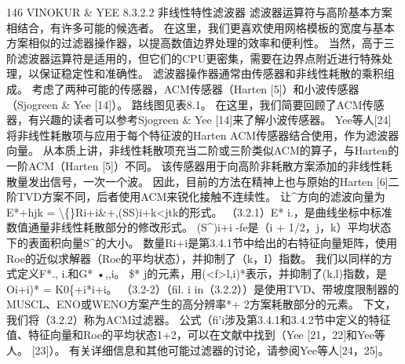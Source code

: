 \documentclass[UTF8,11pt,a4paper,openany,fontset=fandol]{ctexbook}
\begin{document}
146 VINOKUR \& YEE 8.3.2.2 非线性特性滤波器 滤波器运算符与高阶基本方案相结合，有许多可能的候选者。 在这里，我们更喜欢使用网格模板的宽度与基本方案相似的过滤器操作器，以提高数值边界处理的效率和便利性。 当然，高于三阶滤波器运算符是适用的，但它们的CPU更密集，需要在边界点附近进行特殊处理，以保证稳定性和准确性。 滤波器操作器通常由传感器和非线性耗散的乘积组成。 考虑了两种可能的传感器，ACM传感器（Harten [5]）和小波传感器（Sjogreen \& Yee [14]）。 路线图见表8.1。 在这里，我们简要回顾了ACM传感器，有兴趣的读者可以参考Sjogreen \& Yee [14]来了解小波传感器。 Yee等人[24]将非线性耗散项与应用于每个特征波的Harten ACM传感器结合使用，作为滤波器向量。 从本质上讲，非线性耗散项充当二阶或三阶类似ACM的算子，与Harten的一阶ACM（Harten [5]）不同。 该传感器用于向高阶非耗散方案添加的非线性耗散量发出信号，一次一个波。 因此，目前的方法在精神上也与原始的Harten [6]二阶TVD方案不同，后者使用ACM来锐化接触不连续性。 让\textasciicircum{}方向的滤波向量为E*+hjk = \textbackslash\{\}Ri+i\&+,(SS)i+k<jtk的形式。 （3.2.1）E* i.，是曲线坐标中标准数值通量非线性耗散部分的修改形式。 (S\textasciicircum{})i+i -fe是（i + 1/2，j，k）平均状态下的表面积向量S\textasciicircum{}的大小。 数量Ri+i是第3.4.1节中给出的右特征向量矩阵，使用Roe的近似求解器（Roe的平均状态），并抑制了（k，I）指数。 我们以同样的方式定义F*., i.和G* •,,i。 \$* j的元素，用(<f>l,i)*表示，并抑制了(k,l)指数，是Oi+i)* = K0\{+i*i+i。 （3.2-2）（fil. i in（3.2.2））是使用TVD、带坡度限制器的MUSCL、ENO或WENO方案产生的高分辨率*+ 2方案耗散部分的元素。 下文，我们将（3.2.2）称为ACM过滤器。 公式（fi'i涉及第3.4.1和3.4.2节中定义的特征值、特征向量和Roe的平均状态1+2，可以在文献中找到（Yee [21，22]和Yee等人。 [23]）。 有关详细信息和其他可能过滤器的讨论，请参阅Yee等人[24，25]。
\end{document}
